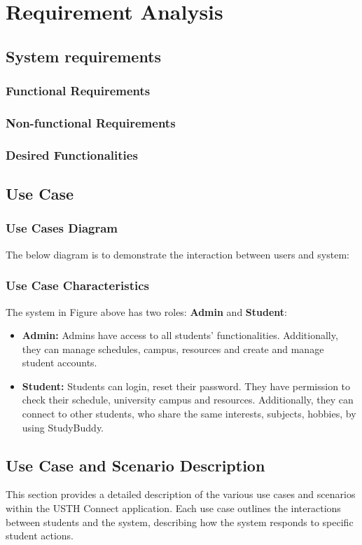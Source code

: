 \documentclass{article}
\begin{document}
\section{Requirement Analysis}
\subsection{System requirements}
\subsubsection{Functional Requirements}
\subsubsection{Non-functional Requirements}
\subsubsection{Desired Functionalities}

\subsection{Use Case}
\subsubsection{Use Cases Diagram}
    The below diagram is to demonstrate the interaction between users and system:
\subsubsection{Use Case Characteristics}
    The system in Figure above has two roles: \textbf{Admin} and \textbf{Student}:
    \begin{itemize}
        \item \textbf{Admin:} Admins have access to all students' functionalities. 
        Additionally, they can manage schedules, campus, resources and create and manage student accounts.
        \item \textbf{Student:}  Students can login, reset their password. They have permission to check their schedule, university campus and resources. Additionally, they can connect to other students, who share the same interests, subjects, hobbies,  by using StudyBuddy.
    \end{itemize}

\subsection{Use Case and Scenario Description}
    This section provides a detailed description of the various use cases and scenarios within the USTH Connect application. 
    Each use case outlines the interactions between students and the system, describing how the system responds to specific student actions.
\end{document}
